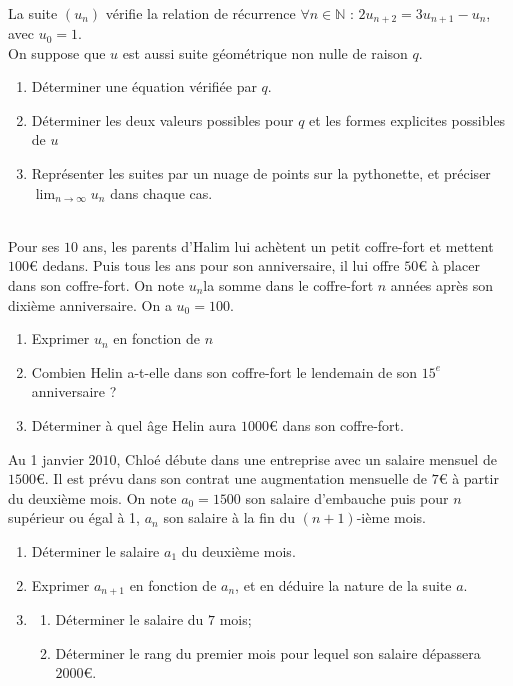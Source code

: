 \documentclass[main.tex]{subfiles}
\begin{document}
\begin{exercise} \label{chapter05:exercise:suites23}   \hfill \\
	La suite $(u_n)$ vérifie la relation de récurrence $\forall n\in\mathbb{N}$ : $2u_{n+2}=3u_{n+1}-u_{n}$, avec $u_0=1$.\\
	 On suppose  que $u$ est aussi suite géométrique non nulle de raison $q$. 
\begin{enumerate}[label=\arabic*),leftmargin=*] 
	\item Déterminer une équation vérifiée par $q$.
	\item Déterminer les deux valeurs possibles pour $q$ et les formes explicites possibles de $u$
	\item Représenter les suites par un nuage de points sur la pythonette, et préciser $\lim_{n\to\infty}u_n$ dans chaque cas. 
\end{enumerate} 
\end{exercise} 
 
\begin{exercise}\label{chapter05:exercise:suites24} \hfill \\
 Pour ses $10$ ans, les parents d'Halim lui achètent un petit coffre-fort et mettent $100$\euro{} dedans. Puis tous les ans pour son anniversaire, il lui offre $50$\euro{} à placer dans son coffre-fort.  On note $u_n$la somme dans le coffre-fort $n$ années après son dixième anniversaire. On a $u_0=100$.
\begin{enumerate}[label=\arabic*),leftmargin=*] 
 	\item Exprimer $u_n$ en fonction de $n$
 	\item Combien Helin a-t-elle dans son coffre-fort le lendemain de son $15^e$ anniversaire ?
 	\item Déterminer à quel âge Helin aura $1000$\euro{} dans son coffre-fort.
 \end{enumerate}
\end{exercise}

\begin{exercise}\label{chapter05:exercise:suites25} %
Au 1\ier{} janvier $2010$, Chloé débute dans une entreprise avec un salaire mensuel de $1500$\euro{}. 
Il est prévu dans son contrat une augmentation mensuelle de $7$\euro{} à partir du deuxième mois. On note $a_0=1 500$ son salaire d'embauche puis pour $n$ supérieur ou égal à 1, $a_n$ son salaire à la fin du $(n+1)$-ième mois.
\begin{enumerate}[label=\arabic*),leftmargin=*] 
	\item Déterminer le salaire $a_1$ du deuxième mois.
	\item Exprimer $a_{n+1}$ en fonction de $a_n$, et en déduire la nature de la suite $a$.
	\item \begin{enumerate}[label=\alph*),leftmargin=*] 
		\item Déterminer le salaire du $7$\ieme{} mois;
		\item Déterminer le rang du premier mois pour lequel son salaire dépassera $2 000$\euro{}.
	\end{enumerate}
\end{enumerate}
\end{exercise}
\end{document}
